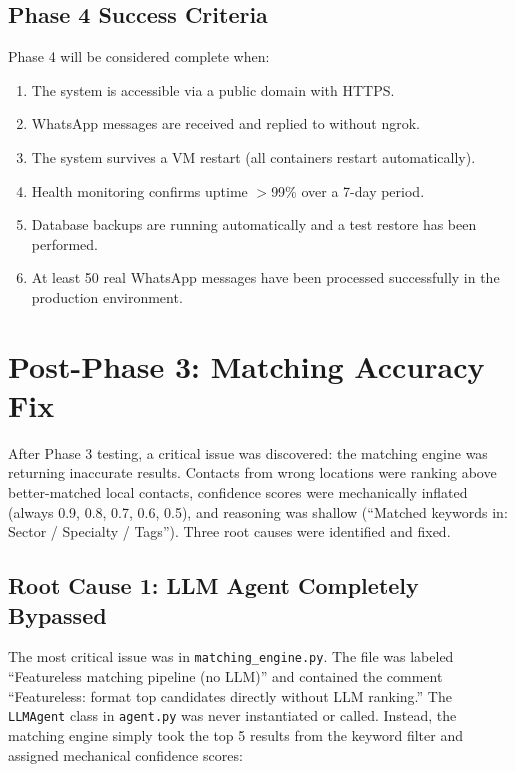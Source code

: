 \documentclass[12pt, a4paper]{report}
\begin{document}
\section{Phase 4 Success Criteria}

Phase 4 will be considered complete when:

\begin{enumerate}[itemsep=3pt]
    \item The system is accessible via a public domain with HTTPS.
    \item WhatsApp messages are received and replied to without ngrok.
    \item The system survives a VM restart (all containers restart automatically).
    \item Health monitoring confirms uptime $>$99\% over a 7-day period.
    \item Database backups are running automatically and a test restore has been performed.
    \item At least 50 real WhatsApp messages have been processed successfully in the production environment.
\end{enumerate}

\chapter{Post-Phase 3: Matching Accuracy Fix}

After Phase 3 testing, a critical issue was discovered: the matching engine was returning inaccurate results. Contacts from wrong locations were ranking above better-matched local contacts, confidence scores were mechanically inflated (always 0.9, 0.8, 0.7, 0.6, 0.5), and reasoning was shallow (``Matched keywords in: Sector / Specialty / Tags''). Three root causes were identified and fixed.

\section{Root Cause 1: LLM Agent Completely Bypassed}

The most critical issue was in \texttt{matching\_engine.py}. The file was labeled ``Featureless matching pipeline (no LLM)'' and contained the comment ``Featureless: format top candidates directly without LLM ranking.'' The \texttt{LLMAgent} class in \texttt{agent.py} was never instantiated or called. Instead, the matching engine simply took the top 5 results from the keyword filter and assigned mechanical confidence scores:
\end{document}
